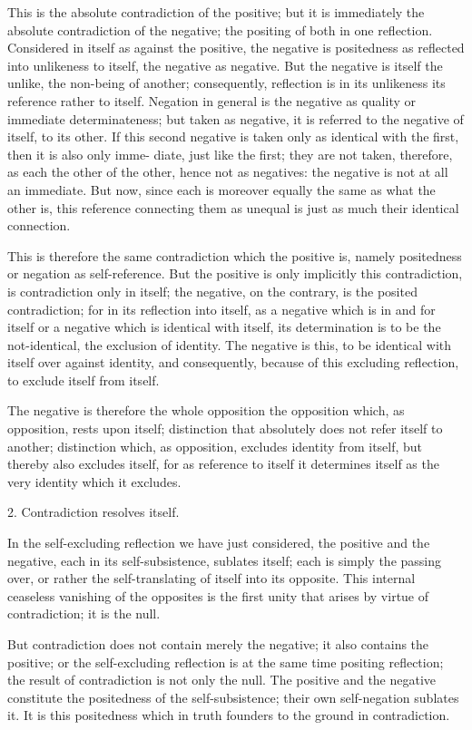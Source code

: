 This is the absolute contradiction of the positive; but it is immediately
the absolute contradiction of the negative; the positing of both in one
reflection.  Considered in itself as against the positive, the negative is
positedness as reflected into unlikeness to itself, the negative as negative. But
the negative is itself the unlike, the non-being of another; consequently,
reflection is in its unlikeness its reference rather to itself.  Negation in
general is the negative as quality or immediate determinateness; but taken
as negative, it is referred to the negative of itself, to its other. If this second
negative is taken only as identical with the first, then it is also only imme-
diate, just like the first; they are not taken, therefore, as each the other of
the other, hence not as negatives: the negative is not at all an immediate.
But now, since each is moreover equally the same as what the other is,
this reference connecting them as unequal is just as much their identical
connection.

This is therefore the same contradiction which the positive is, namely
positedness or negation as self-reference. But the positive is only implicitly
this contradiction, is contradiction only in itself; the negative, on the
contrary, is the posited contradiction; for in its reflection into itself, as a
negative which is in and for itself or a negative which is identical with
itself, its determination is to be the not-identical, the exclusion of identity.
The negative is this, to be identical with itself over against identity, and
consequently, because of this excluding reflection, to exclude itself from
itself.

The negative is therefore the whole opposition  the opposition which,
as opposition, rests upon itself; distinction that absolutely does not refer
itself to another; distinction which, as opposition, excludes identity from
itself, but thereby also excludes itself, for as reference to itself it determines
itself as the very identity which it excludes.

2. Contradiction resolves itself.

In the self-excluding reflection we have just considered, the positive and
the negative, each in its self-subsistence, sublates itself; each is simply the
passing over, or rather the self-translating of itself into its opposite. This
internal ceaseless vanishing of the opposites is the first unity that arises by
virtue of contradiction; it is the null.

But contradiction does not contain merely the negative; it also contains
the positive; or the self-excluding reflection is at the same time positing
reflection; the result of contradiction is not only the null.  The positive
and the negative constitute the positedness of the self-subsistence; their own
self-negation sublates it. It is this positedness which in truth founders to the
ground in contradiction.

